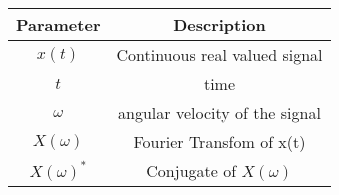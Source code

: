 \renewcommand{\arraystretch}{1.5}
\begin{tabular}{|c|c|}
\hline
Parameter & Description  \\\hline
\( x(t) \) & Continuous real valued signal  \\\hline
\(t \) & time \\\hline
\(\omega \) & angular velocity of the signal \\\hline
\(X(\omega)\)& Fourier Transfom of x(t)\\\hline
\(X(\omega)^*\) & Conjugate of \(X(\omega)\) \\ \hline
\end{tabular}
